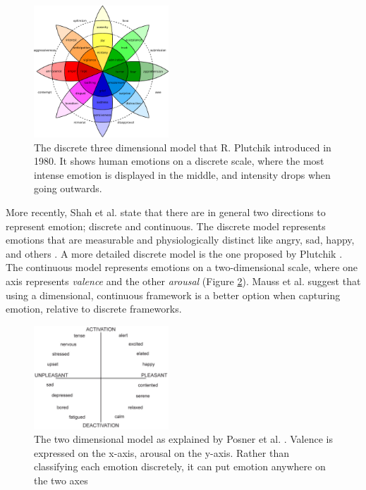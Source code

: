 \documentclass{sigchi}
\begin{document}
\begin{figure}[t]
    \centering
    \includegraphics[width=0.45\textwidth]{images/PlutchikWheelOfEmotions.eps}
    \caption{The discrete three dimensional model that R. Plutchik \protect\cite{Plutchik1980} introduced in 1980. It shows human emotions on a discrete scale, where the most intense emotion is displayed in the middle, and intensity drops when going outwards.}
    \label{fig:wheel_of_emotions}
\end{figure}

More recently, Shah et al. \cite{Shah2015} state that there are in general two directions to represent emotion; discrete and continuous. The discrete model represents emotions that are measurable and physiologically distinct like angry, sad, happy, and others \cite{Ekman1992}. A more detailed discrete model is the one proposed by Plutchik \cite{Plutchik1980}. The continuous model represents emotions on a two-dimensional scale, where one axis represents \textit{valence} and the other \textit{arousal} \cite{Posner2005} (Figure \ref{fig:circumplex_model}). Mauss et al. \cite{Mauss2009} suggest that using a dimensional, continuous framework is a better option when capturing emotion, relative to discrete frameworks. 

\begin{figure}[ht]
    \centering
    \includegraphics[width=0.45\textwidth]{images/CircumplexModel.jpg}
    \caption{The two dimensional model as explained by Posner et al. \protect\cite{Posner2005}. Valence is expressed on the x-axis, arousal on the y-axis. Rather than classifying each emotion discretely, it can put emotion anywhere on the two axes}
    \label{fig:circumplex_model}
\end{figure}
\end{document}
